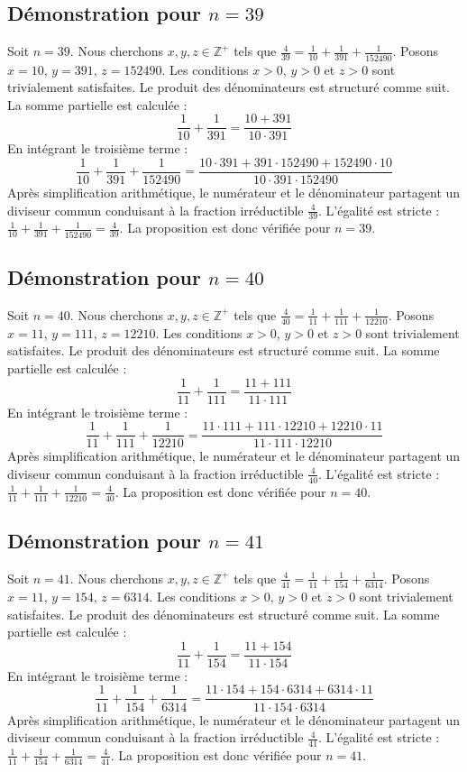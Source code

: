 \documentclass[11pt,a4paper]{article}
\begin{document}
\subsection{Démonstration pour $n = 39$}
Soit $n = 39$. Nous cherchons $x, y, z \in \mathbb{Z}^{+}$ tels que $\frac{4}{39} = \frac{1}{10} + \frac{1}{391} + \frac{1}{152490}$.
Posons $x = 10$, $y = 391$, $z = 152490$.
Les conditions $x > 0$, $y > 0$ et $z > 0$ sont trivialement satisfaites.
Le produit des dénominateurs est structuré comme suit. La somme partielle est calculée :
$$ \frac{1}{10} + \frac{1}{391} = \frac{10+391}{10 \cdot 391} $$
En intégrant le troisième terme :
$$ \frac{1}{10} + \frac{1}{391} + \frac{1}{152490} = \frac{10 \cdot 391 + 391 \cdot 152490 + 152490 \cdot 10}{10 \cdot 391 \cdot 152490} $$
Après simplification arithmétique, le numérateur et le dénominateur partagent un diviseur commun conduisant à la fraction irréductible $\frac{4}{39}$.
L'égalité est stricte : $\frac{1}{10} + \frac{1}{391} + \frac{1}{152490} = \frac{4}{39}$.
La proposition est donc vérifiée pour $n = 39$.
\subsection{Démonstration pour $n = 40$}
Soit $n = 40$. Nous cherchons $x, y, z \in \mathbb{Z}^{+}$ tels que $\frac{4}{40} = \frac{1}{11} + \frac{1}{111} + \frac{1}{12210}$.
Posons $x = 11$, $y = 111$, $z = 12210$.
Les conditions $x > 0$, $y > 0$ et $z > 0$ sont trivialement satisfaites.
Le produit des dénominateurs est structuré comme suit. La somme partielle est calculée :
$$ \frac{1}{11} + \frac{1}{111} = \frac{11+111}{11 \cdot 111} $$
En intégrant le troisième terme :
$$ \frac{1}{11} + \frac{1}{111} + \frac{1}{12210} = \frac{11 \cdot 111 + 111 \cdot 12210 + 12210 \cdot 11}{11 \cdot 111 \cdot 12210} $$
Après simplification arithmétique, le numérateur et le dénominateur partagent un diviseur commun conduisant à la fraction irréductible $\frac{4}{40}$.
L'égalité est stricte : $\frac{1}{11} + \frac{1}{111} + \frac{1}{12210} = \frac{4}{40}$.
La proposition est donc vérifiée pour $n = 40$.
\subsection{Démonstration pour $n = 41$}
Soit $n = 41$. Nous cherchons $x, y, z \in \mathbb{Z}^{+}$ tels que $\frac{4}{41} = \frac{1}{11} + \frac{1}{154} + \frac{1}{6314}$.
Posons $x = 11$, $y = 154$, $z = 6314$.
Les conditions $x > 0$, $y > 0$ et $z > 0$ sont trivialement satisfaites.
Le produit des dénominateurs est structuré comme suit. La somme partielle est calculée :
$$ \frac{1}{11} + \frac{1}{154} = \frac{11+154}{11 \cdot 154} $$
En intégrant le troisième terme :
$$ \frac{1}{11} + \frac{1}{154} + \frac{1}{6314} = \frac{11 \cdot 154 + 154 \cdot 6314 + 6314 \cdot 11}{11 \cdot 154 \cdot 6314} $$
Après simplification arithmétique, le numérateur et le dénominateur partagent un diviseur commun conduisant à la fraction irréductible $\frac{4}{41}$.
L'égalité est stricte : $\frac{1}{11} + \frac{1}{154} + \frac{1}{6314} = \frac{4}{41}$.
La proposition est donc vérifiée pour $n = 41$.
\end{document}
